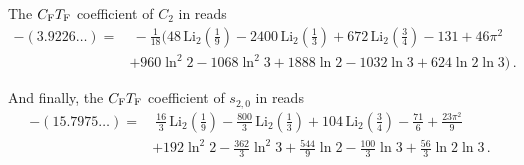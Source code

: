 The $C_\mathrm{F}T_\mathrm{F}$ coefficient of $C_2$ in  reads
\begin{equation}
  \begin{split}
    -(3.9226\ldots) = &\ - \frac{1}{18} \bigg(
    48\,\text{Li}_2\left(\frac{1}{9}\right)-2400\,\text{Li}_2
    \left(\frac{1}{3}\right)+672\,\text{Li}_2\left(\frac{3}{4}\right)-131+46
    \pi ^2 \\ &+960 \ln^2 2 -1068 \ln^2 3 +1888 \ln 2-1032\ln 3+624 \ln
    2 \ln 3 \bigg) \,.
    \label{eq:c2cftf}
  \end{split}
\end{equation}

And finally, the $C_\mathrm{F}T_\mathrm{F}$ coefficient of $s_{2,0}$ in 
reads
\begin{equation}
  \begin{split}
    -(15.7975 \dots) =
    &\ \frac{16}{3} \, \text{Li}_2\left(\frac{1}{9}\right) - \frac{800}{3} \, \text{Li}_2\left(\frac{1}{3}\right) + 104 \, \text{Li}_2\left(\frac{3}{4}\right) -\frac{71}{6}+\frac{23 \pi ^2}{9} \\
    &+ 192 \ln^2 2 - \frac{362}{3} \ln^2 3 +\frac{544}{9} \ln 2-\frac{100}{3} \ln 3 + \frac{56}{3} \ln 2 \ln 3 \,.
    \label{eq:s20cftf}
  \end{split}
\end{equation}

\newcommand{\bibentry}[4]{#1, {\it #2}, #3\ifthenelse{\equal{#4}{}}{}{, }#4.}
\newcommand{\journal}[5]{\href{https://dx.doi.org/#5}{\textit{#1} {\bf #2} (#3) #4}}
\newcommand{\arxiv}[2]{\href{https://arXiv.org/abs/#1}{\texttt{arXiv:#1\,[#2]}}}
\newcommand{\arxivhepph}[1]{\href{https://arXiv.org/abs/hep-ph/#1}{\texttt{hep-ph/#1}}}
\newcommand{\arxivhepth}[1]{\href{https://arXiv.org/abs/hep-th/#1}{\texttt{hep-th/#1}}}
\newcommand{\arxivheplat}[1]{\href{https://arXiv.org/abs/hep-lat/#1}{\texttt{hep-lat/#1}}}
\newcommand{\arxivmathph}[1]{\href{https://arXiv.org/abs/math-ph/#1}{\texttt{math-ph/#1}}}
\newcommand{\arxivmath}[1]{\href{https://arXiv.org/abs/math/#1}{\texttt{arXiv:#1 [math]}}}

